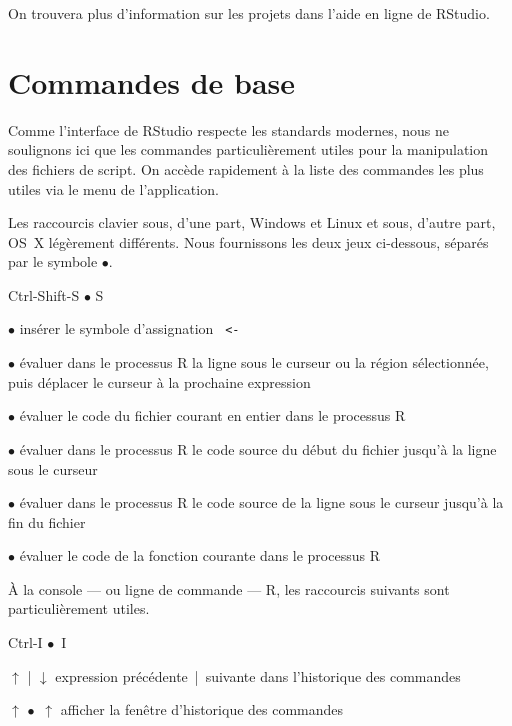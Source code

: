 On trouvera plus d'information sur les projets dans l'aide en ligne
de RStudio.



\section{Commandes de base}
\label{rstudio:commandes}

Comme l'interface de RStudio respecte les standards modernes, nous ne
soulignons ici que les commandes particulièrement utiles pour la
manipulation des fichiers de script. On accède rapidement à la liste
des commandes les plus utiles via le menu  de
l'application.

Les raccourcis clavier sous, d'une part, Windows et Linux et sous,
d'autre part, OS~X légèrement différents. Nous fournissons les deux
jeux ci-dessous, séparés par le symbole $\bullet$.

\begin{ttscript}{Ctrl-Shift-S $\bullet$ \cmdkey\shiftkey S}
  \raggedright
\item[\rstudio{Alt+-} $\bullet$ \rstudio{\optkey\,-}] insérer le
  symbole d'assignation \verb*| <- |
\item[\rstudio{Ctrl+Retour} $\bullet$ \rstudio{\cmdkey\,\returnkey}]
  évaluer dans le processus R la ligne sous le curseur ou la région
  sélectionnée, puis déplacer le curseur à la prochaine expression
\item[\rstudio{Ctrl+Shift+S} $\bullet$ \rstudio{\shiftkey\,\cmdkey\,S}]
  évaluer le code du fichier courant en entier dans le processus R
\item[\rstudio{Ctrl+Alt+B} $\bullet$ \rstudio{\optkey\,\cmdkey\,B}]
  évaluer dans le processus R le code source du début du fichier
  jusqu'à la ligne sous le curseur
\item[\rstudio{Ctrl+Alt+E} $\bullet$ \rstudio{\optkey\,\cmdkey\,E}]
  évaluer dans le processus R le code source de la ligne sous le curseur
  jusqu'à la fin du fichier
\item[\rstudio{Ctrl+Alt+F} $\bullet$ \rstudio{\optkey\,\cmdkey\,F}]
  évaluer le code de la fonction courante dans le processus R
\end{ttscript}

À la console --- ou ligne de commande --- R, les raccourcis suivants
sont particulièrement utiles.
\begin{ttscript}{Ctrl-I $\bullet$ \cmdkey\,I}
  \raggedright
\item[$\uparrow$ | $\downarrow$] expression
  précédente~|~suivante dans l'historique des commandes
\item[\code{Ctrl+}$\uparrow$ $\bullet$ \cmdkey\,$\uparrow$] afficher
  la fenêtre d'historique des commandes
\end{ttscript}

